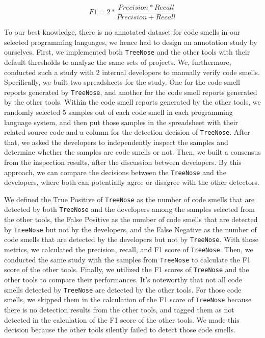 \vspace{-1.5em}

\begin{equation}
    F1 = 2 * \frac{Precision * Recall}{Precision + Recall}
\end{equation}

To our best knowledge, there is no annotated dataset for code smells in our
selected programming languages, we hence had to design an annotation study by
ourselves. First, we implemented both \texttt{TreeNose} and the other tools
with their default thresholds to analyze the same sets of projects. We,
furthermore, conducted such a study with 2 internal developers to manually
verify code smells. Specifically, we built two spreadsheets for the study. One
for the code smell reports generated by \texttt{TreeNose}, and another for the
code smell reports generated by the other tools. Within the code smell reports
generated by the other tools, we randomly selected 5 samples out of each code
smell in each programming language system, and then put those samples in the
spreadsheet with their related source code and a column for the detection
decision of \texttt{TreeNose}. After that, we asked the developers to
independently inspect the samples and determine whether the samples are code
smells or not. Then, we built a consensus from the inspection results, after
the discussion between developers. By this approach, we can compare the
decisions between the \texttt{TreeNose} and the developers, where both can
potentially agree or disagree with the other detectors.

We defined the True Positive of \texttt{TreeNose} as the number of code smells
that are detected by both \texttt{TreeNose} and the developers among the
samples selected from the other tools, the False Positive as the number of code
smells that are detected by \texttt{TreeNose} but not by the developers, and
the False Negative as the number of code smells that are detected by the
developers but not by \texttt{TreeNose}. With those metrics, we calculated the
precision, recall, and F1 score of \texttt{TreeNose}. Then, we conducted the
same study with the samples from \texttt{TreeNose} to calculate the F1 score of
the other tools. Finally, we utilized the F1 scores of \texttt{TreeNose} and
the other tools to compare their performances. It's noteworthy that not all
code smells detected by \texttt{TreeNose} are detected by the other tools. For
those code smells, we skipped them in the calculation of the F1 score of
\texttt{TreeNose} because there is no detection results from the other tools,
and tagged them as not detected in the calculation of the F1 score of the other
tools. We made this decision because the other tools silently failed to detect
those code smells.


